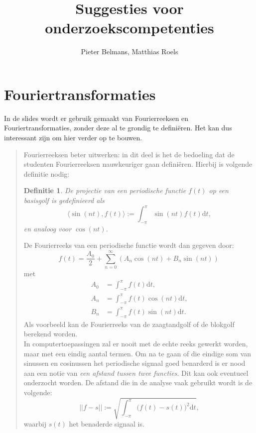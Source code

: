 \documentclass[10pt,a4paper]{article}
\title{Suggesties voor onderzoekscompetenties}
\author{Pieter Belmans, Matthias Roels}
\newtheorem{definition}{Definitie}
\begin{document}
\maketitle

\section{Fouriertransformaties}
In de slides wordt er gebruik gemaakt van Fourierreeksen en Fouriertransformaties, zonder deze al te grondig te defini\"eren. Het kan dus interessant zijn om hier verder op te bouwen.
\begin{quote}
Fourierreeksen beter uitwerken: in dit deel is het de bedoeling dat de studenten Fourierreeksen nauwkeuriger gaan defini\"eren. Hierbij is volgende definitie nodig: 
\begin{definition}
De projectie van een periodische functie $f(t)$ op een basisgolf is gedefinieerd als 
\begin{equation*}
\langle \sin{(n t)},f(t) \rangle:=\int_{-\pi}^{\pi} \sin{(n t)}f(t)\mathrm{d}t,
\end{equation*}
en analoog voor $\cos{(n t)}$.
\end{definition}
De Fourierreeks van een periodische functie wordt dan gegeven door: 
\begin{equation*}
f(t)=\frac{A_0}{2}+\sum_{n=0}^{\infty}\left(A_n \cos{(n t)}+B_n\sin{(n t)}\right) \, 
\end{equation*}
met
\begin{align*}
A_0&=\int_{-\pi}^{\pi} f(t)\mathrm{d}t, \\
A_n&=\int_{-\pi}^{\pi} f(t)\cos(n t)\mathrm{d}t, \\
B_n&=\int_{-\pi}^{\pi} f(t)\sin(n t)\mathrm{d}t.
\end{align*}
Als voorbeeld kan de Fourierreeks van de zaagtandgolf of de blokgolf berekend worden. \\
\noindent
In computertoepassingen zal er nooit met de echte reeks gewerkt worden, maar met een eindig aantal termen. Om na te gaan of die eindige som van sinussen en cosinussen
het periodische signaal goed benarderd is er nood aan een notie van \textit{een afstand tussen twee functies}. Dit kan ook eventueel onderzocht worden. De afstand die in de analyse vaak gebruikt wordt is de volgende:
\begin{equation*}
||f-s||:=\sqrt{\int_{-\pi}^{\pi} \Big(f(t)-s(t)\Big)^2\mathrm{d}t},
\end{equation*}
waarbij $s(t)$ het benaderde signaal is. 
\end{quote}
\end{document}
